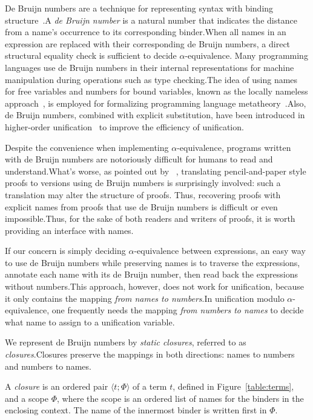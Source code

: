 \documentclass[a4paper,UKenglish]{lipics-v2016}
\newcommand{\clos}[2] {
\langle #1; #2 \rangle
}
\begin{document}
De Bruijn numbers are a technique for representing syntax with binding
structure~\citep{de_bruijn_lambda_1972}.A \emph{de Bruijn number} is
a natural number that indicates the distance from a name's occurrence
to its corresponding binder.When all names in an expression are
replaced with their corresponding de Bruijn numbers, a direct
structural equality check is sufficient to decide
$\alpha$-equivalence. Many programming languages use de Bruijn numbers
in their internal representations for machine manipulation during
operations such as type checking.The idea of using names for free
variables and numbers for bound variables, known as the locally
nameless approach~\citep{chargueraud_locally_2012}, is employed for
formalizing programming language metatheory~\citep{aydemir_nominal_2006,
aydemir_engineering_2008}.Also, de Bruijn numbers, combined with
explicit substitution, have been introduced in higher-order
unification~\citep{dowek_higher_2000} to improve the efficiency of
unification.

Despite the convenience when implementing $\alpha$-equivalence,
programs written with de Bruijn numbers are notoriously difficult for
humans to read and understand.What's worse, as pointed out by
~\citet{berghofer_head--head_2007}, translating
pencil-and-paper style proofs to versions using de Bruijn numbers is
surprisingly involved: such a translation may alter the structure of
proofs. Thus, recovering proofs with explicit names from proofs that use de
Bruijn numbers is difficult or even impossible.Thus, for the sake of
both readers and writers of proofs, it is worth providing an interface
with names.

If our concern is simply deciding $\alpha$-equivalence between
expressions, an easy way to use de Bruijn numbers while preserving
names is to traverse the expressions, annotate each name with its de
Bruijn number, then read back the expressions without numbers.This
approach, however, does not work for unification, because it only
contains the mapping \emph{from names to numbers}.In unification
modulo $\alpha$-equivalence, one frequently needs the mapping
\emph{from numbers to names} to decide what name to assign to a
unification variable.

We represent de Bruijn numbers by \emph{static closures},
referred to as \emph{closures}.Closures preserve the
mappings in both directions: names to numbers and numbers to names.

\begin{definition}
A \emph{closure} is an ordered pair $\clos{t}{\Phi}$ of a term $t$,
defined in Figure~\ref{table:terms}, and a scope $\Phi$, where the
scope is an ordered list of names for the binders in the enclosing
context. The name of the innermost binder is written first in $\Phi$.
\end{definition}
\end{document}

